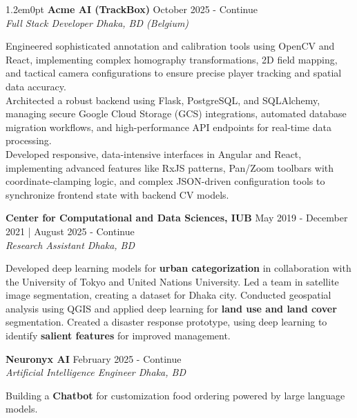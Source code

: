 \documentclass[a4paper,10pt]{article}
\begin{document}
\begin{adjustwidth}{1.2em}{0pt}
\textbf{Acme AI (TrackBox)} \hfill October 2025 - Continue\\
\textit{Full Stack Developer \hfill Dhaka, BD (Belgium)}

\vspace{0.1em}

Engineered sophisticated annotation and calibration tools using OpenCV and React, implementing complex homography transformations, 2D field mapping, and tactical camera configurations to ensure precise player tracking and spatial data accuracy.\\
Architected a robust backend using Flask, PostgreSQL, and SQLAlchemy, managing secure Google Cloud Storage (GCS) integrations, automated database migration workflows, and high-performance API endpoints for real-time data processing.\\
Developed responsive, data-intensive interfaces in Angular and React, implementing advanced features like RxJS patterns, Pan/Zoom toolbars with coordinate-clamping logic, and complex JSON-driven configuration tools to synchronize frontend state with backend CV models.
\vspace{0.1em}

\textbf{Center for Computational and Data Sciences, IUB} \hfill May 2019 - December 2021 | August 2025 - Continue\\
\textit{Research Assistant \hfill Dhaka, BD}

\vspace{0.1em}

Developed deep learning models for \textbf{urban categorization} in collaboration with the University of Tokyo and United Nations University. Led a team in satellite image segmentation, creating a dataset for Dhaka city. Conducted geospatial analysis using QGIS and applied deep learning for \textbf{land use and land cover} segmentation. Created a disaster response prototype, using deep learning to identify \textbf{salient features} for improved management.

\vspace{0.1em}

\textbf{Neuronyx AI} \hfill February 2025 - Continue\\
\textit{Artificial Intelligence Engineer \hfill Dhaka, BD}

\vspace{0.1em}

Building a \textbf{Chatbot} for customization food ordering powered by large language models.


\end{adjustwidth}
\end{document}
